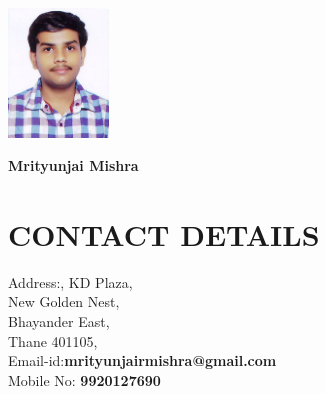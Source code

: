 \documentclass[paper=a4,fontsize=12pt]{scrartcl}
\newcommand{\NewPart}[1]{\section*{\uppercase{#1}}}
\begin{document}
\includegraphics[width=0.2\textwidth]{Mrityunjai_2.jpg}
\begin{flushright}
\textbf{\huge Mrityunjai Mishra}
\end{flushright}


\NewPart{Contact Details}{}
\begin{minipage}{0.6\textwidth}\raggedright 
\indent Address:, KD Plaza, \\
\quad\quad\quad\quad\quad New Golden Nest,  \\
\quad\quad\quad\quad\quad Bhayander East,\\
\quad\quad\quad\quad\quad Thane 401105,\\
\indent Email-id:\quad\textbf{mrityunjairmishra@gmail.com} \\
\indent Mobile No: \textbf{9920127690} \\

\end{minipage}
\end{document}
